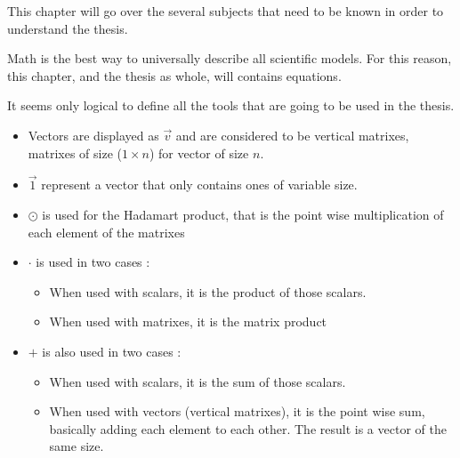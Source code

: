 \label{cap:state}

This chapter will go over the several subjects that need to be known in order to understand the thesis.

Math is the best way to universally describe all scientific models. For this reason, this chapter, and the thesis as whole, will contains equations.

It seems only logical to define all the tools that are going to be used in the thesis.

\begin{itemize}
  \item Vectors are displayed as $\overrightarrow{v}$ and are considered to be vertical matrixes, matrixes of size ($1\times n$) for vector of size $n$.
  \item $\overrightarrow{1}$ represent a vector that only contains ones of variable size.
  \item $\odot$ is used for the Hadamart product, that is the point wise multiplication of each element of the matrixes
  \item $\cdot$ is used in two cases :
    \begin{itemize}
      \item When used with scalars, it is the product of those scalars.
      \item When used with matrixes, it is the matrix product
    \end{itemize}
  \item $+$ is also used in two cases :
    \begin{itemize}
      \item When used with scalars, it is the sum of those scalars.
      \item When used with vectors (vertical matrixes), it is the point wise sum, basically adding each element to each other. The result is a vector of the same size.
    \end{itemize}
\end{itemize}











\cleardoublepage
